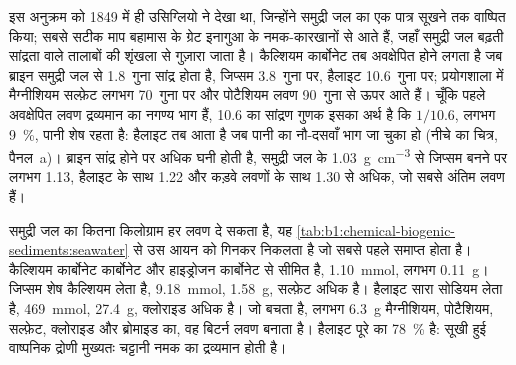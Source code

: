 इस अनुक्रम को 1849 में ही उसिग्लियो ने देखा था, जिन्होंने समुद्री जल का एक पात्र सूखने तक वाष्पित किया; सबसे सटीक माप बहामास के ग्रेट इनागुआ के नमक-कारखानों से आते हैं, जहाँ समुद्री जल बढ़ती सांद्रता वाले तालाबों की शृंखला से गुज़ारा जाता है। कैल्शियम कार्बोनेट तब अवक्षेपित होने लगता है जब ब्राइन समुद्री जल से 1.8~गुना सांद्र होता है, जिप्सम 3.8~गुना पर, हैलाइट 10.6~गुना पर; प्रयोगशाला में मैग्नीशियम सल्फ़ेट लगभग 70~गुना पर और पोटैशियम लवण 90~गुना से ऊपर आते हैं। चूँकि पहले अवक्षेपित लवण द्रव्यमान का नगण्य भाग हैं, 10.6 का सांद्रण गुणक इसका अर्थ है कि $1/10.6$, लगभग \qty{9}{\%}, पानी शेष रहता है: हैलाइट तब आता है जब पानी का नौ-दसवाँ भाग जा चुका हो (नीचे का चित्र, पैनल~a)। ब्राइन सांद्र होने पर अधिक घनी होती है, समुद्री जल के \qty{1.03}{g.cm^{-3}} से जिप्सम बनने पर लगभग \num{1.13}, हैलाइट के साथ \num{1.22} और कड़वे लवणों के साथ \num{1.30} से अधिक, जो सबसे अंतिम लवण हैं।

समुद्री जल का कितना किलोग्राम हर लवण दे सकता है, यह \cref{tab:b1:chemical-biogenic-sediments:seawater} से उस आयन को गिनकर निकलता है जो सबसे पहले समाप्त होता है। कैल्शियम कार्बोनेट कार्बोनेट और हाइड्रोजन कार्बोनेट से सीमित है, \qty{1.10}{mmol}, लगभग \qty{0.11}{g}। जिप्सम शेष कैल्शियम लेता है, \qty{9.18}{mmol}, \qty{1.58}{g}, सल्फ़ेट अधिक है। हैलाइट सारा सोडियम लेता है, \qty{469}{mmol}, \qty{27.4}{g}, क्लोराइड अधिक है। जो बचता है, लगभग \qty{6.3}{g} मैग्नीशियम, पोटैशियम, सल्फ़ेट, क्लोराइड और ब्रोमाइड का, वह बिटर्न लवण बनाता है। हैलाइट पूरे का \qty{78}{\%} है: सूखी हुई वाष्पनिक द्रोणी मुख्यतः चट्टानी नमक का द्रव्यमान होती है।

